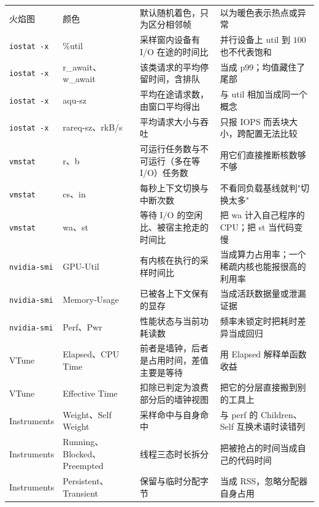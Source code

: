 \documentclass[12pt,a4paper,fontset=fandol]{ctexbook}
\newcommand{\Tp}[1]{\texttt{#1}}
\newcommand{\Bk}{\discretionary{}{}{}}
\newcommand{\Lang}[1]{\textsf{#1}}
\newcommand{\MCpu}{\Lang{CPU}}
\newcommand{\Mx}[1]{\textsf{#1}}
\begin{document}
\begin{longtable}{>{\raggedright\arraybackslash}p{} >{\raggedright\arraybackslash}p{} >{\raggedright\arraybackslash}p{} >{\raggedright\arraybackslash}p{}}
火焰图 & 颜色 & 默认随机着色，只为区分相邻帧 & 以为暖色表示热点或异常 \\
\Tp{iostat -x} & \%util & 采样窗内设备有 I/O 在途的时间比 & 并行设备上 \Mx{util} 到 $100$ 也不代表饱和 \\
\Tp{iostat -x} & r\_await、w\_await & 该类请求的平均停留时间，含排队 & 当成 \Mx{p99}；均值藏住了尾部 \\
\Tp{iostat -x} & aqu-sz & 平均在途请求数，由窗口平均得出 & 与 \Mx{util} 相加当成同一个概念 \\
\Tp{iostat -x} & rareq-sz、rkB/s & 平均请求大小与吞吐 & 只报 IOPS 而丢块大小，跨配置无法比较 \\
\Tp{vmstat} & r、b & 可运行任务数与不可运行（多在等 I/O）任务数 & 用它们直接推断核数够不够 \\
\Tp{vmstat} & cs、in & 每秒上下文切换与中断次数 & 不看同负载基线就判"切换太多" \\
\Tp{vmstat} & wa、st & 等待 I/O 的空闲比、被宿主抢走的时间比 & 把 wa 计入自己程序的 \MCpu{}；把 st 当代码变慢 \\
\Tp{nvidia-{\Bk}smi} & GPU-Util & 有内核在执行的采样时间比 & 当成算力占用率；一个稀疏内核也能报很高的利用率 \\
\Tp{nvidia-{\Bk}smi} & Memory-Usage & 已被各上下文保有的显存 & 当成活跃数据量或泄漏证据 \\
\Tp{nvidia-{\Bk}smi} & Perf、Pwr & 性能状态与当前功耗读数 & 频率未锁定时把耗时差异当成回归 \\
VTune & Elapsed、CPU Time & 前者是墙钟，后者是占用时间，差值主要是等待 & 用 Elapsed 解释单函数收益 \\
VTune & Effective Time & 扣除已判定为浪费部分后的墙钟视图 & 把它的分层直接搬到别的工具上 \\
Instruments & Weight、Self Weight & 采样命中与自身命中 & 与 perf 的 Children、Self 互换术语时读错列 \\
Instruments & Running、Blocked、Preempted & 线程三态时长拆分 & 把被抢占的时间当成自己的代码时间 \\
Instruments & Persistent、Transient & 保留与临时分配字节 & 当成 RSS，忽略分配器自身占用 \\
\end{longtable}
\end{document}
